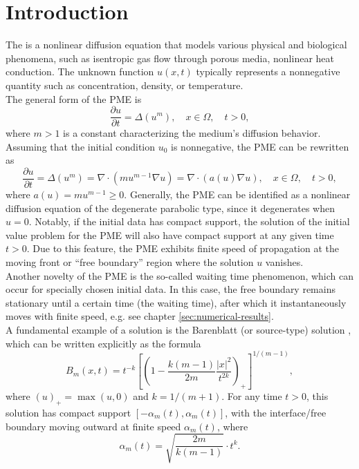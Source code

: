 \documentclass[a4paper,12pt]{paper}
\begin{document}
\section{Introduction}
The  is a nonlinear diffusion equation that models various physical and biological phenomena, such as isentropic gas flow through porous media, nonlinear heat conduction. The unknown function \( u(x,t) \) typically represents a nonnegative quantity such as concentration, density, or temperature.\\
The general form of the PME is
\[
\frac{\partial u}{\partial t} = \Delta (u^m), \quad x \in \Omega, \quad t > 0,
\]
where \( m > 1 \) is a constant characterizing the medium's diffusion behavior. Assuming that the initial condition \( u_0 \) is nonnegative, the PME can be rewritten as
\[
\frac{\partial u}{\partial t} = \Delta (u^m) = \nabla \cdot (m u^{m-1} \nabla u) = \nabla \cdot (a(u)\nabla u), \quad x \in \Omega, \quad t > 0,
\]
where \( a(u) = m u^{m-1} \geq 0 \). Generally, the PME can be identified as a nonlinear diffusion equation of the degenerate parabolic type, since it degenerates when \( u=0 \). Notably, if the initial data has compact support, the solution of the initial value problem for the PME will also have compact support at any given time \( t>0 \). Due to this feature, the PME exhibits finite speed of propagation at the moving front or ``free boundary'' region where the solution $ u $ vanishes.\\ Another novelty of the PME is the so-called waiting time phenomenon, which can occur for specially chosen initial data. In this case, the free boundary remains stationary until a certain time (the waiting time), after which it instantaneously moves with finite speed, e.g. see chapter \ref{sec:numerical-results}.\\
A fundamental example of a solution is the Barenblatt (or source-type) solution \cite{Barenblatt}, which can be written explicitly as the formula 
\begin{equation}
	\label{eq:barenblatt function}
	B_m(x, t)=t^{-k}\left[\left(1-\frac{k(m-1)}{2 m} \frac{|x|^2}{t^{2 k}}\right)_{+}\right]^{1 /(m-1)},
\end{equation}
where \( (u)_{+}=\max (u, 0) \) and \( k=1/(m+1) \). For any time \( t>0 \), this solution has compact support \(\left[-\alpha_m(t), \alpha_m(t)\right]\), with the interface/free boundary moving outward at finite speed $\alpha_m(t)$, where
\[
\alpha_m(t)=\sqrt{\frac{2 m}{k(m-1)}} \cdot t^k.
\]
\end{document}
